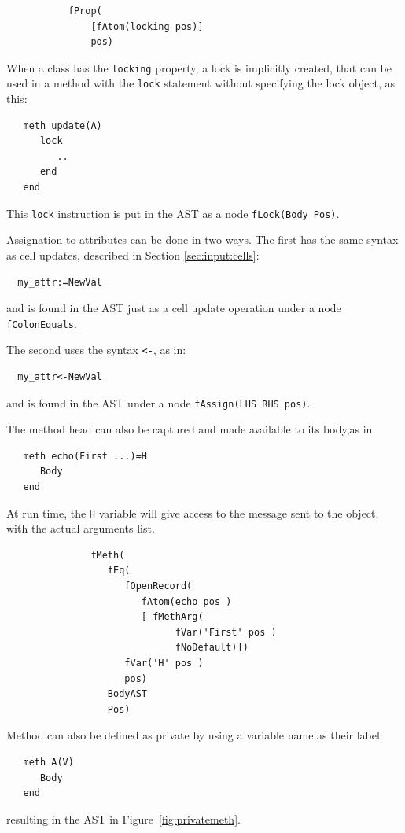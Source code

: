 \documentclass[a4paper]{memoir}
\begin{document}
\begin{lstlisting}
           fProp(
               [fAtom(locking pos)]
               pos)
\end{lstlisting}

When a class has the \lstinline!locking! property, a lock is implicitly created,
that can be used in a method with the \lstinline!lock! statement without
specifying the lock object, as this:

\begin{lstlisting}
   meth update(A)
      lock
         ..
      end
   end
\end{lstlisting}

This \lstinline!lock! instruction is put in the AST as a node
\lstinline!fLock(Body Pos)!. 

Assignation to attributes can be done in two ways. The first has the same syntax
as cell updates, described in Section \ref{sec:input:cells}:
\begin{lstlisting}
  my_attr:=NewVal
\end{lstlisting}
and is found in the AST just as a cell update operation under a node
\lstinline!fColonEquals!.

The second uses the syntax \lstinline!<-!, as in:
\begin{lstlisting}
  my_attr<-NewVal
\end{lstlisting}
and is found in the AST under a node \lstinline!fAssign(LHS RHS pos)!.

\label{compilerinput:classes:headcapture}The method head can also be captured and made available to its body,as in 
\begin{lstlisting}
   meth echo(First ...)=H
      Body
   end  
\end{lstlisting}
At run time, the \lstinline!H! variable will give access to the message sent to the object, with the actual arguments list.
\begin{lstlisting}
               fMeth(
                  fEq(
                     fOpenRecord(
                        fAtom(echo pos )
                        [ fMethArg(
                              fVar('First' pos )
                              fNoDefault)])
                     fVar('H' pos )
                     pos)
                  BodyAST
                  Pos)
\end{lstlisting}

Method can also be defined as private by using a variable name as their label:
\begin{lstlisting}
   meth A(V)
      Body
   end
\end{lstlisting}
resulting in the AST in Figure~\ref{fig:privatemeth}.
\end{document}
